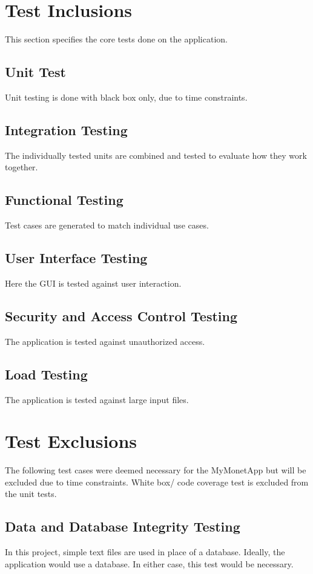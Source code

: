 \documentclass{article}
\begin{document}
\section{Test Inclusions}
This section specifies the core tests done on the application.
\subsection{Unit Test}

Unit testing is done with black box only, due to time constraints.

\subsection{Integration Testing}
The individually tested units are combined and tested to evaluate how they work together.
\subsection{Functional Testing}
Test cases are generated to match individual use cases.

\subsection{User Interface Testing}
Here the GUI is tested against user interaction.

\subsection{Security and Access Control Testing}
The application is tested against unauthorized access.

\subsection{Load Testing}
The application is tested against large input files.

\section{Test Exclusions}

The following test cases were deemed necessary for the MyMonetApp but will be excluded due to time constraints. White box/ code coverage test is excluded from the unit tests.


\subsection{Data and Database Integrity Testing}
In this project, simple text files are used in place of a database. Ideally, the application would use a database. In either case, this test would be necessary.
\end{document}
